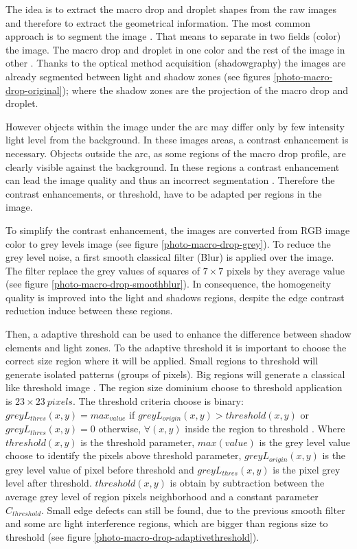 \documentclass[12pt]{iopart}
\begin{document}
The idea is to extract the macro drop and droplet shapes 
from the raw images and therefore to extract the geometrical information.
 The most common approach is to segment the image \cite{WANG}. 
That means to separate in two fields (color) the image. The macro drop and droplet in one color and
the rest of the image in other \cite{COCQUEREZ}. Thanks to the optical method acquisition
 (shadowgraphy) the images are already segmented between
light and shadow zones (see figures \ref{photo-macro-drop-original});
 where the shadow zones are the projection of the macro drop and droplet.

However objects within the image under the arc may differ only by few intensity light level
from the background. In these images areas, a contrast enhancement is necessary. 
Objects outside the arc, as  some regions of the macro drop profile,
 are clearly visible against the background. In these regions a contrast enhancement 
can lead the image quality and thus an incorrect segmentation \cite{NORDBRUCH}.
 Therefore the contrast enhancements, or threshold, have to be adapted per regions in the image.  

To simplify the contrast enhancement, the images are converted from RGB image color 
to grey levels image (see figure \ref{photo-macro-drop-grey}). To 
reduce the grey level noise, a first smooth classical filter 
(Blur) is applied over the image. The filter replace
the grey values of squares of $7\times 7$ 
pixels by they average value (see figure \ref{photo-macro-drop-smoothblur}). 
In consequence, the homogeneity quality is improved into the light and 
shadows regions, despite the edge contrast reduction induce between these regions. 

Then, a  adaptive threshold can be used to enhance the difference
between shadow elements and light zones. To the adaptive threshold it is important 
to choose the correct size region where it will be applied. Small regions to threshold
will generate isolated patterns (groups of pixels). Big regions will generate
a classical like threshold image \cite{SABER}. The region size dominium choose
to threshold application is $23\times 23\ pixels$. The threshold criteria 
choose is binary: $greyL_{thres}(x,y) = max_{value}$ if $greyL_{origin}(x,y) >  threshold(x,y)$
or $greyL_{thres}(x,y) = 0$ otherwise, $\forall (x,y)$ inside the region
to threshold \cite{OPENCV}. Where $threshold(x,y)$ is the threshold parameter,
 $max(value)$ is the grey level value choose to identify the pixels above
threshold parameter, $greyL_{origin}(x,y)$ is the grey level value of pixel
 before threshold and $greyL_{thres}(x,y)$ is the pixel grey level after threshold.
$threshold(x,y)$ is obtain by subtraction between the average grey level of region
 pixels neighborhood and a constant parameter $C_{threshold}$.  
Small edge defects can still be found, due to the previous smooth filter and some arc 
light interference regions, which are bigger than regions size to
threshold (see figure \ref{photo-macro-drop-adaptivethreshold}).  
\end{document}
